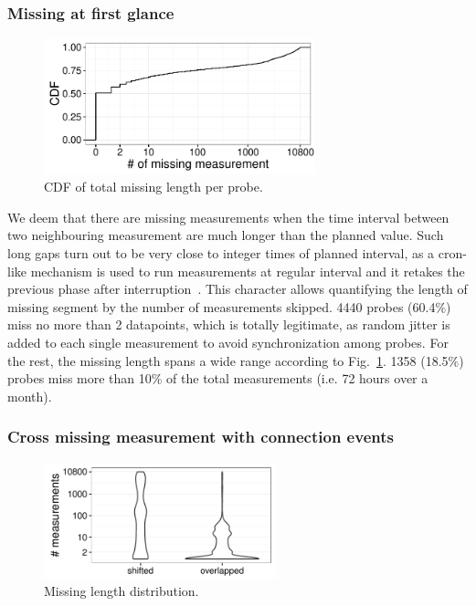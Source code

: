 \subsubsection{Missing at first glance}
\begin{figure}
\centering
\includegraphics[width=0.7\textwidth]{gfx/chap3/missing_length_cdf.pdf}
\caption{CDF of total missing length per probe.}
\label{fig:miss_len}
\end{figure}
We deem that there are missing measurements when the time interval between two neighbouring measurement are much longer than the planned value. 
Such long gaps turn out to be very close to integer times of planned interval, as a cron-like mechanism is used to run measurements at regular interval and it retakes the previous phase after interruption~\cite{source, schedule}.
This character allows quantifying the length of missing segment by the number of measurements skipped.
4440 probes  (60.4\%) miss no more than 2 datapoints, which is totally legitimate, as random jitter is added to each single measurement to avoid synchronization among probes.
For the rest, the missing length spans a wide range according to Fig.~\ref{fig:miss_len}.
1358 (18.5\%) probes miss more than 10\% of the total measurements (i.e. 72 hours over a month).

\subsubsection{Cross missing measurement with connection events}

\begin{figure}[!htb]
\centering
\includegraphics[width=0.6\textwidth]{gfx/chap3/len_by_ratio.pdf}
\caption{Missing length distribution.}
\label{fig:len_ratio}
\end{figure}

